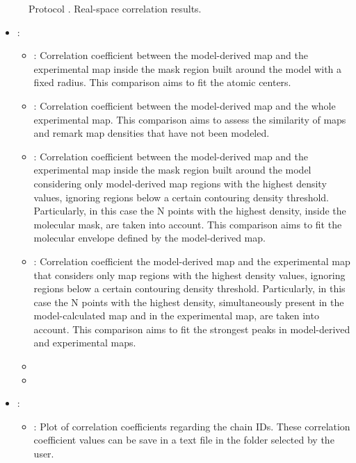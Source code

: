 \begin{itemize}
\begin{itemize}
\begin{figure}[H]
         \caption{Protocol . Real-space correlation results.}
         \label{fig:app_protocol_real_space_refine_4}
        \end{figure}
        \begin{itemize}
         \item {} \citep{afonine2018b}: 
         \begin{itemize}  
          \item {}: Correlation coefficient between the model-derived map and the experimental map inside the mask region built around the model with a fixed radius. This comparison aims to fit the atomic centers.
          \item {}: Correlation coefficient between the model-derived map and the whole experimental map. This comparison aims to assess the similarity of maps and remark map densities that have not been modeled.
          \item {}: Correlation coefficient between the model-derived map and the experimental map inside the mask region built around the model considering only model-derived map regions with the highest density values, ignoring regions below a certain contouring density threshold. Particularly, in this case the N points with the highest density, inside the molecular mask, are taken into account. This comparison aims to fit the molecular envelope defined by the model-derived map.
          \item {}: Correlation coefficient the model-derived map and the experimental map that considers only map regions with the highest density values, ignoring regions below a certain contouring density threshold. Particularly, in this case the N points with the highest density, simultaneously present in the model-calculated map and in the experimental map, are taken into account. This comparison aims to fit the strongest peaks in model-derived and experimental maps.
          \item {}
          \item {}
         \end{itemize}
         \item {}:
         \begin{itemize}
           \item {}: Plot of correlation coefficients regarding the chain IDs. These correlation coefficient values can be save in a text file in the folder selected by the user.

\end{itemize}
\end{itemize}
\end{itemize}
\end{itemize}
